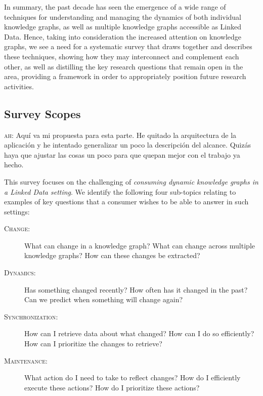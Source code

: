\documentclass[sw]{iosart2x}
\newcommand{\ah}[1]{{\color{blue!70!black}\textsc{ah:} #1}}
\begin{document}

In summary, the past decade has seen the emergence of a wide range of techniques for understanding and managing the dynamics of both individual knowledge graphs, as well as multiple knowledge graphs accessible as Linked Data. Hence, taking into consideration the increased attention on knowledge graphs, we see a need for a systematic survey that draws together and describes these techniques, showing how they may interconnect and complement each other, as well as distilling the key research questions that remain open in the area, providing a framework in order to appropriately position future research activities.


\subsection{Survey Scopes}\label{Scopes}


\ah{Aquí va mi propuesta para esta parte. He quitado la arquitectura de la aplicación y he intentado generalizar un poco la descripción del alcance. Quizás haya que ajustar las cosas un poco para que quepan mejor con el trabajo ya hecho.}

This survey focuses on the challenging of \textit{consuming dynamic knowledge graphs in a Linked Data setting}. We identify the following four sub-topics relating to examples of key questions that a consumer wishes to be able to answer in such settings:

\begin{description}
\item[\textsc{Change}:] What can change in a knowledge graph? What can change across multiple knowledge graphs? How can these changes be extracted? 
\item[\textsc{Dynamics}:] Has something changed recently? How often has it changed in the past? Can we predict when something will change again?
\item[\textsc{Synchronization}:] How can I retrieve data about what changed? How can I do so efficiently? How can I prioritize the changes to retrieve?
\item[\textsc{Maintenance}:] What action do I need to take to reflect changes? How do I efficiently execute these actions? How do I prioritize these actions?
\end{description}
\end{document}
